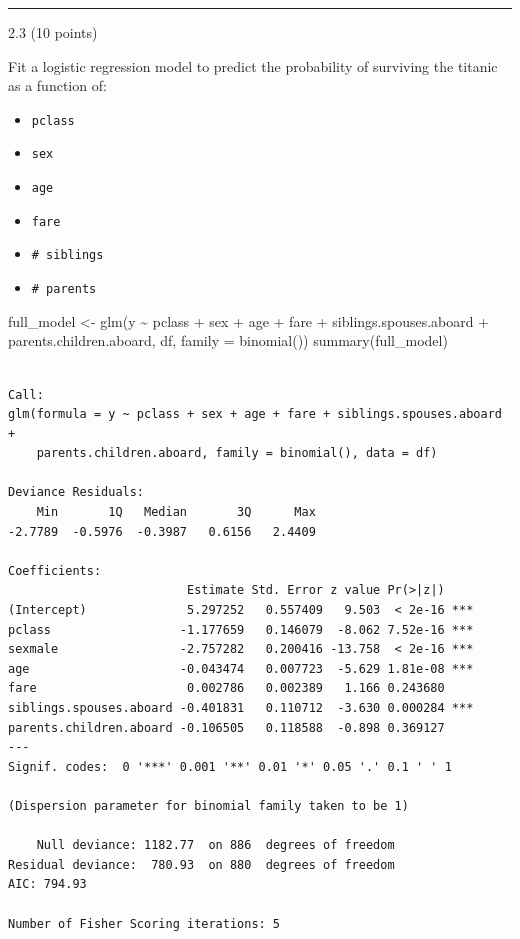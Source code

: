 \documentclass[
  letterpaper,
  DIV=11,
  numbers=noendperiod]{scrartcl}
\newenvironment{Shaded}{\begin{snugshade}}{\end{snugshade}}
\newcommand{\AttributeTok}[1]{\textcolor[rgb]{0.40,0.45,0.13}{#1}}
\newcommand{\FunctionTok}[1]{\textcolor[rgb]{0.28,0.35,0.67}{#1}}
\newcommand{\NormalTok}[1]{\textcolor[rgb]{0.00,0.23,0.31}{#1}}
\newcommand{\OtherTok}[1]{\textcolor[rgb]{0.00,0.23,0.31}{#1}}
\newcommand{\SpecialCharTok}[1]{\textcolor[rgb]{0.37,0.37,0.37}{#1}}
\providecommand{\tightlist}{%
  \setlength{\itemsep}{0pt}\setlength{\parskip}{0pt}}\usepackage{longtable,booktabs,array}
\begin{document}
\begin{center}\rule{0.5\linewidth}{0.5pt}\end{center}

2.3 (10 points)

Fit a logistic regression model to predict the probability of surviving
the titanic as a function of:

\begin{itemize}
\tightlist
\item
  \texttt{pclass}
\item
  \texttt{sex}
\item
  \texttt{age}
\item
  \texttt{fare}
\item
  \texttt{\#\ siblings}
\item
  \texttt{\#\ parents}
\end{itemize}

\begin{Shaded}
\begin{Highlighting}[]
\NormalTok{full\_model }\OtherTok{\textless{}{-}} \FunctionTok{glm}\NormalTok{(y }\SpecialCharTok{\textasciitilde{}}\NormalTok{ pclass }\SpecialCharTok{+}\NormalTok{ sex }\SpecialCharTok{+}\NormalTok{ age }\SpecialCharTok{+}\NormalTok{ fare  }\SpecialCharTok{+}\NormalTok{ siblings.spouses.aboard }\SpecialCharTok{+}\NormalTok{ parents.children.aboard, df, }\AttributeTok{family =} \FunctionTok{binomial}\NormalTok{())}
\FunctionTok{summary}\NormalTok{(full\_model)}
\end{Highlighting}
\end{Shaded}

\begin{verbatim}

Call:
glm(formula = y ~ pclass + sex + age + fare + siblings.spouses.aboard + 
    parents.children.aboard, family = binomial(), data = df)

Deviance Residuals: 
    Min       1Q   Median       3Q      Max  
-2.7789  -0.5976  -0.3987   0.6156   2.4409  

Coefficients:
                         Estimate Std. Error z value Pr(>|z|)    
(Intercept)              5.297252   0.557409   9.503  < 2e-16 ***
pclass                  -1.177659   0.146079  -8.062 7.52e-16 ***
sexmale                 -2.757282   0.200416 -13.758  < 2e-16 ***
age                     -0.043474   0.007723  -5.629 1.81e-08 ***
fare                     0.002786   0.002389   1.166 0.243680    
siblings.spouses.aboard -0.401831   0.110712  -3.630 0.000284 ***
parents.children.aboard -0.106505   0.118588  -0.898 0.369127    
---
Signif. codes:  0 '***' 0.001 '**' 0.01 '*' 0.05 '.' 0.1 ' ' 1

(Dispersion parameter for binomial family taken to be 1)

    Null deviance: 1182.77  on 886  degrees of freedom
Residual deviance:  780.93  on 880  degrees of freedom
AIC: 794.93

Number of Fisher Scoring iterations: 5
\end{verbatim}
\end{document}
